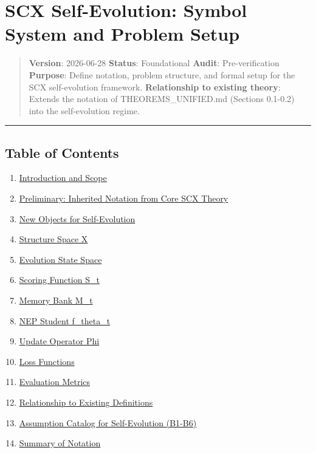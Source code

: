 \documentclass[
  12pt,
]{article}
\author{SCX}
\date{2026}
\providecommand{\tightlist}{%
  \setlength{\itemsep}{0pt}\setlength{\parskip}{0pt}}
\begin{document}
\section{SCX Self-Evolution: Symbol System and Problem
Setup}\label{scx-self-evolution-symbol-system-and-problem-setup}

\begin{quote}
\textbf{Version}: 2026-06-28 \textbar{} \textbf{Status}: Foundational
\textbar{} \textbf{Audit}: Pre-verification \textbf{Purpose}: Define
notation, problem structure, and formal setup for the SCX self-evolution
framework. \textbf{Relationship to existing theory}: Extends the
notation of THEOREMS\_UNIFIED.md (Sections 0.1-0.2) into the
self-evolution regime.
\end{quote}

\begin{center}\rule{0.5\linewidth}{0.5pt}\end{center}

\subsection{Table of Contents}\label{table-of-contents}

\begin{enumerate}
\def\labelenumi{\arabic{enumi}.}
\tightlist
\item
  \hyperref[1-introduction-and-scope]{Introduction and Scope}
\item
  \hyperref[2-preliminary-inherited-notation-from-core-scx-theory]{Preliminary:
  Inherited Notation from Core SCX Theory}
\item
  \hyperref[3-new-objects-for-self-evolution]{New Objects for
  Self-Evolution}
\item
  \hyperref[4-structure-space-x]{Structure Space X}
\item
  \hyperref[5-evolution-state-space]{Evolution State Space}
\item
  \hyperref[6-scoring-function-s_t]{Scoring Function S\_t}
\item
  \hyperref[7-memory-bank-m_t]{Memory Bank M\_t}
\item
  \hyperref[8-nep-student-f_theta_t]{NEP Student f\_theta\_t}
\item
  \hyperref[9-update-operator-phi]{Update Operator Phi}
\item
  \hyperref[10-loss-functions]{Loss Functions}
\item
  \hyperref[11-evaluation-metrics]{Evaluation Metrics}
\item
  \hyperref[12-relationship-to-existing-definitions]{Relationship to
  Existing Definitions}
\item
  \hyperref[13-assumption-catalog-for-self-evolution-b1-b6]{Assumption
  Catalog for Self-Evolution (B1-B6)}
\item
  \hyperref[14-summary-of-notation]{Summary of Notation}
\end{enumerate}
\end{document}
